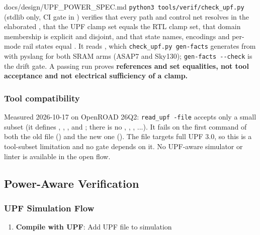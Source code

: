 \begin{relocated}{docs/design/UPF_POWER_SPEC.md}
\texttt{python3\ tools/\allowbreak{}verif/\allowbreak{}check\_\allowbreak{}upf.\allowbreak{}py}
(stdlib only, CI gate in ) verifies that every
 path and control net resolves in the elaborated
, that the UPF clamp set equals the RTL clamp set, that
domain membership is explicit and disjoint, and that state names,
encodings and per-mode rail states equal . It reads
, which
\texttt{check\_\allowbreak{}upf.\allowbreak{}py\ gen-\allowbreak{}facts}
generates from  with pyslang for both SRAM
arms (ASAP7 and Sky130);
\texttt{gen-\allowbreak{}facts\ -\allowbreak{}-\allowbreak{}check} is
the drift gate. A passing run proves \textbf{references and set
equalities, not tool acceptance and not electrical sufficiency of a
clamp.}

\subsubsection{Tool compatibility}\label{ds:ch:upf-power-spec:tool-compatibility}

Measured 2026-10-17 on OpenROAD 26Q2:
\texttt{read\_\allowbreak{}upf\ -\allowbreak{}file} accepts only a small
subset (it defines , ,
,  and
; there is no ,
, , ...). It fails on the
first command of both the old file () and the
new one (). The file targets full UPF 3.0, so this is
a tool-subset limitation and no gate depends on it. No UPF-aware
simulator or linter is available in the open flow.

\subsection{Power-Aware Verification}\label{ds:ch:upf-power-spec:power-aware-verification}

\subsubsection{UPF Simulation Flow}\label{ds:ch:upf-power-spec:upf-simulation-flow}

\begin{enumerate}
\def\labelenumi{\arabic{enumi}.}
\item
  \textbf{Compile with UPF}: Add UPF file to simulation


\end{enumerate}
\end{relocated}
